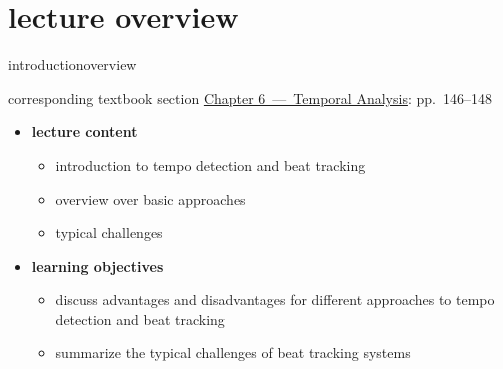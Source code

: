 




\subtitle{Module 6.2: Tempo Detection}


	

    \section[overview]{lecture overview}
        \begin{frame}{introduction}{overview}
            \begin{block}{corresponding textbook section}
                    \href{http://ieeexplore.ieee.org/xpl/articleDetails.jsp?arnumber=6331122}{Chapter 6~---~Temporal Analysis}: pp.~146--148
            \end{block}

            \begin{itemize}
                \item   \textbf{lecture content}
                    \begin{itemize}
                        \item   introduction to tempo detection and beat tracking
                        \item   overview over basic approaches
                        \item    typical challenges
                    \end{itemize}
                \bigskip
                \item<2->   \textbf{learning objectives}
                    \begin{itemize}
                        \item   discuss advantages and disadvantages for different approaches to tempo detection and beat tracking
                        \item   summarize the typical challenges of beat tracking systems
                    \end{itemize}
            \end{itemize}
        \end{frame}

